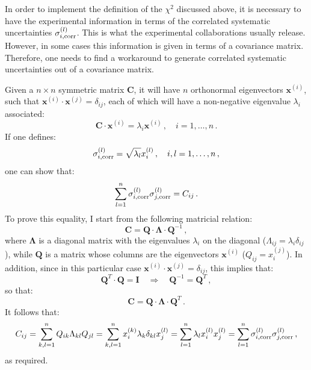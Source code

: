 \documentclass[10pt,a4paper]{article}
\begin{document}
In order to implement the definition of the $\chi^2$ discussed above,
it is necessary to have the experimental information in terms of the
correlated systematic uncertainties $\sigma_{i,\rm corr}^{(l)}$. This
is what the experimental collaborations usually release. However, in
some cases this information is given in terms of a covariance
matrix. Therefore, one needs to find a workaround to generate
correlated systematic uncertainties out of a covariance matrix. 

Given a $n \times n$ symmetric matrix $\mathbf{C}$, it will have $n$
orthonormal eigenvectors $\mathbf{x}^{(i)}$, such that
$\mathbf{x}^{(i)}\cdot \mathbf{x}^{(j)}=\delta_{ij}$, each of which
will have a non-negative eigenvalue $\lambda_i$ associated:
\begin{equation}
  \mathbf{C}\cdot \mathbf{x}^{(i)} = \lambda_i \mathbf{x}^{(i)}\,, \quad
  i =1,\dots,n\,.
\end{equation}
If one defines:
\begin{equation}\label{eq:artsys}
  \sigma_{i,\rm corr}^{(l)} = \sqrt{\lambda_l} x_i^{(l)}\,,\quad i,l=1,\dots,n\,,
\end{equation}
one can show that:
\begin{equation}\label{eq:artsydef}
  \sum_{l=1}^{n}\sigma_{i,\rm corr}^{(l)}\sigma_{j,\rm corr}^{(l)} =C_{ij}\,.
\end{equation}
To prove this equality, I start from the following matricial relation:
\begin{equation}
\mathbf{C} =\mathbf{Q}\cdot \mathbf{\Lambda}\cdot \mathbf{Q}^{-1}\,,
\end{equation}
where $\mathbf{\Lambda}$ is a diagonal matrix with the eigenvalues
$\lambda_i$ on the diagonal ($\Lambda_{ij} = \lambda_i\delta_{ij}$),
while $\mathbf{Q}$ is a matrix whose columns are the eigenvectors
$\mathbf{x}^{(i)}$ ($Q_{ij} = x_{i}^{(j)}$). In addition, since in
this particular case
$\mathbf{x}^{(i)}\cdot \mathbf{x}^{(j)}=\delta_{ij}$, this implies
that:
\begin{equation}
\mathbf{Q}^T \cdot \mathbf{Q}  = \mathbf{I}\quad\Rightarrow\quad
\mathbf{Q}^{-1} =  \mathbf{Q}^{T}\,,
\end{equation}
so that:
\begin{equation}\label{eq:diagC}
  \mathbf{C} =\mathbf{Q}\cdot \mathbf{\Lambda}\cdot \mathbf{Q}^{T}\,.
\end{equation}
It follows that:
\begin{equation}
  C_{ij} =\sum_{k,l=1}^{n}Q_{ik}\Lambda_{kl} Q_{jl} = \sum_{k,l=1}^{n} x_{i}^{(k)}
  \lambda_{k}\delta_{kl}x_{j}^{(l)} = \sum_{l=1}^{n} \lambda_{l}x_{i}^{(l)}
  x_{j}^{(l)}=\sum_{l=1}^{n}\sigma_{i,\rm corr}^{(l)}\sigma_{j,\rm corr}^{(l)} \,,
\end{equation}
as required.
\end{document}
